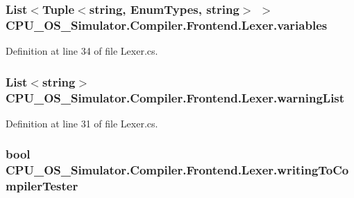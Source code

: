 \subsubsection[{variables}]{\setlength{\rightskip}{0pt plus 5cm}List$<$Tuple$<$string, {\bf Enum\+Types}, string$>$ $>$ C\+P\+U\+\_\+\+O\+S\+\_\+\+Simulator.\+Compiler.\+Frontend.\+Lexer.\+variables\hspace{0.3cm}{\ttfamily [private]}}\label{class_c_p_u___o_s___simulator_1_1_compiler_1_1_frontend_1_1_lexer_af7e42e63231b352e446b5be89623c74a}


Definition at line 34 of file Lexer.\+cs.

\hypertarget{class_c_p_u___o_s___simulator_1_1_compiler_1_1_frontend_1_1_lexer_ac240cede3460c43d89c4387c04f00377}{}
\subsubsection[{warning\+List}]{\setlength{\rightskip}{0pt plus 5cm}List$<$string$>$ C\+P\+U\+\_\+\+O\+S\+\_\+\+Simulator.\+Compiler.\+Frontend.\+Lexer.\+warning\+List\hspace{0.3cm}{\ttfamily [private]}}\label{class_c_p_u___o_s___simulator_1_1_compiler_1_1_frontend_1_1_lexer_ac240cede3460c43d89c4387c04f00377}


Definition at line 31 of file Lexer.\+cs.

\hypertarget{class_c_p_u___o_s___simulator_1_1_compiler_1_1_frontend_1_1_lexer_a8a75fa6d30d6d3b2ab713a729d85b081}{}
\subsubsection[{writing\+To\+Compiler\+Tester}]{\setlength{\rightskip}{0pt plus 5cm}bool C\+P\+U\+\_\+\+O\+S\+\_\+\+Simulator.\+Compiler.\+Frontend.\+Lexer.\+writing\+To\+Compiler\+Tester\hspace{0.3cm}{\ttfamily [private]}}\label{class_c_p_u___o_s___simulator_1_1_compiler_1_1_frontend_1_1_lexer_a8a75fa6d30d6d3b2ab713a729d85b081}


